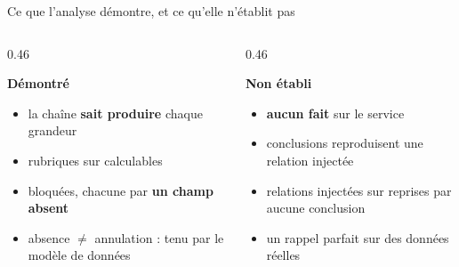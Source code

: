 \documentclass[aspectratio=169,11pt]{beamer}
\begin{document}
\begin{frame}{Ce que l'analyse démontre, et ce qu'elle n'établit pas}
  \vspace{2mm}
  \begin{columns}[T]
    \begin{column}{0.46\textwidth}
      {\large\bfseries\color{accentgarde}Démontré\par}
      \medskip
      \begin{itemize}\setlength{\itemsep}{2mm}
        \item la chaîne \textbf{sait produire} chaque grandeur
        \item \textbf{} rubriques sur  calculables
        \item {} bloquées, chacune par \textbf{un champ absent}
        \item absence $\neq$ annulation : tenu par le modèle de données
      \end{itemize}
    \end{column}
    \begin{column}{0.46\textwidth}
      {\large\bfseries\color{griscartouche}Non établi\par}
      \medskip
      \begin{itemize}\setlength{\itemsep}{2mm}
        \item \textbf{aucun fait} sur le service
        \item {} conclusions reproduisent une relation injectée
        \item {} relations injectées sur  reprises par aucune conclusion
        \item un rappel parfait sur des données réelles
      \end{itemize}
    \end{column}
  \end{columns}
\end{frame}
\end{document}

